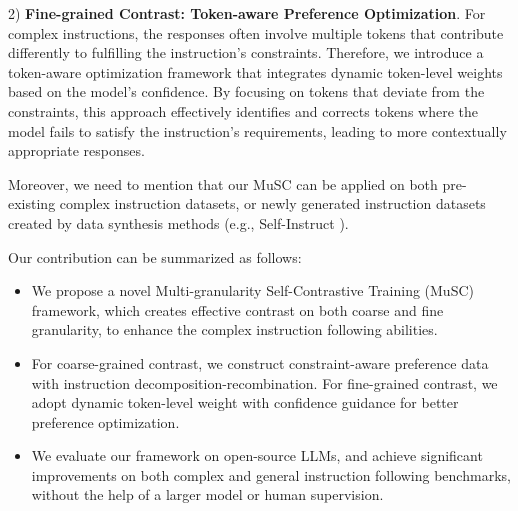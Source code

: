 2) \textbf{Fine-grained Contrast: Token-aware Preference Optimization}. For complex instructions, the responses often involve multiple tokens that contribute differently to fulfilling the instruction's constraints. Therefore, we introduce a token-aware optimization framework that integrates dynamic token-level weights based on the model’s confidence. By focusing on tokens that deviate from the constraints, this approach effectively identifies and corrects tokens where the model fails to satisfy the instruction’s requirements, leading to more contextually appropriate responses.

Moreover, we need to mention that our MuSC can be applied on both pre-existing complex instruction datasets, or newly generated instruction datasets created by data synthesis methods (e.g.,  Self-Instruct \cite{selfinstruct}). 

Our contribution can be summarized as follows:

\vspace{-2mm}

\begin{itemize}[itemsep=1mm, parsep=0pt]
    \item We propose a novel Multi-granularity Self-Contrastive Training (MuSC) framework, which creates effective contrast on both coarse and fine granularity, to enhance the complex instruction following abilities.
    \item For coarse-grained contrast, we construct constraint-aware preference data with instruction decomposition-recombination. For fine-grained contrast, we adopt dynamic token-level weight with confidence guidance for better preference optimization.
    \item We evaluate our framework on open-source LLMs, and achieve significant improvements on both complex and general instruction following benchmarks, without the help of a larger model or human supervision.
\end{itemize}

\vspace{-1mm}

